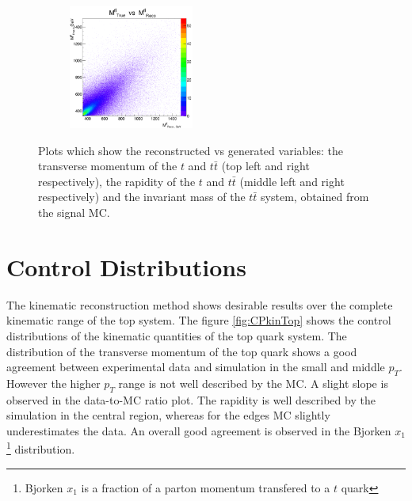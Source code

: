 \begin{figure}[t]
\begin{subfigure}
\end{subfigure}
\begin{subfigure}
  \centering
  \includegraphics[width=0.45\textwidth]{05_kinReco/plots/scatter/mtt-scaterPlot.png}
\end{subfigure}
\caption{Plots which show the reconstructed vs generated variables: the transverse momentum of the $t$ and $t\bar{t}$ (top left and right respectively), 
        the rapidity of the $t$ and $t\bar{t}$ (middle left and right respectively) and the invariant mass of the $t\bar{t}$ system, obtained from the 
        signal MC.}
\label{fig:ScatterPl}
\end{figure}

\section{Control Distributions}

The kinematic reconstruction method shows desirable results over the complete kinematic range of the top system. The figure \ref{fig:CPkinTop} shows
the control distributions of the kinematic quantities of the top quark system. The distribution of the transverse momentum of the top quark
shows a good agreement between experimental data and simulation in the small and middle $p_{T}$. However the higher $p_{T}$ range is not well
described by the MC. A slight slope is observed in the data-to-MC ratio plot. The rapidity is well described by the simulation in the central region, 
whereas for the edges MC slightly underestimates the data.
An overall good agreement is observed in the Bjorken $x_{1}$\footnote{Bjorken $x_{1}$ is a fraction of a parton momentum transfered to a $t$ quark} 
distribution.

